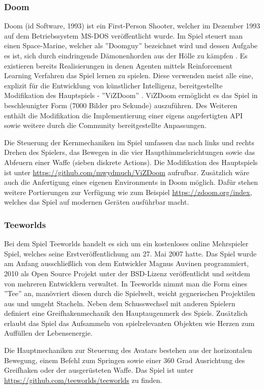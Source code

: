 \documentclass[11pt]{scrartcl}
\begin{document}
\subsubsection{Doom}
Doom (id Software, 1993) ist ein First-Person Shooter, welcher im Dezember 1993 auf dem Betriebssystem
MS-DOS veröffentlicht wurde. Im Spiel steuert man einen Space-Marine, welcher als ''Doomguy'' bezeichnet
wird und dessen Aufgabe es ist, sich durch eindringende Dämonenhorden aus der Hölle zu kämpfen
\cite{D1993}. Es existieren bereits Realisierungen in denen Agenten mittels Reinforcement Learning
Verfahren das Spiel lernen zu spielen. Diese verwenden meist alle eine, explizit für die Entwicklung
von künstlicher Intelligenz, bereitgestellte Modifikation des Hauptspiels - ''ViZDoom'' \cite{ViZDoom}. 
ViZDoom ermöglicht es das Spiel in beschleunigter Form (7000 Bilder pro Sekunde) auszuführen. Des
Weiteren enthält die Modifikation die Implementierung einer eigens angefertigten API sowie weitere
durch die Community bereitgestellte Anpassungen.

Die Steuerung der Kernmechaniken im Spiel umfassen das nach links und rechts Drehen des Spielers,
das Bewegen in die vier Haupthimmelsrichtungen sowie das Abfeuern einer Waffe (sieben diskrete
Actions). Die Modifikation des Hauptspiels ist unter \url{https://github.com/mwydmuch/ViZDoom}
aufrufbar. Zusätzlich wäre auch die Anfertigung eines eigenen Environments in Doom möglich. Dafür
stehen weitere Portierungen zur Verfügung wie zum Beispiel \url{https://zdoom.org/index}, welches
das Spiel auf modernen Geräten ausführbar macht. 

\subsubsection{Teeworlds}
Bei dem Spiel Teeworlds handelt es sich um ein kostenloses online Mehrspieler Spiel, welches seine
Erstveröffentlichung am 27. Mai 2007 hatte. Das Spiel wurde am Anfang ausschließlich von dem
Entwickler Magnus Auvinen programmiert, 2010 als Open Source Projekt unter der BSD-Lizenz
veröffentlicht und seitdem von mehreren Entwicklern verwaltet. In Teeworlds nimmt man die Form
eines ''Tee'' an, manövriert diesen durch die Spielwelt, weicht gegnerischen Projektilen aus und
umgeht Stacheln. Neben dem Schusswechsel mit anderen Spielern definiert eine Greifhakenmechanik den
Hauptaugenmerk des Spiels. Zusätzlich erlaubt das Spiel das Aufsammeln von spielrelevanten Objekten
wie Herzen zum Auffüllen der Lebensenergie.

Die Hauptmechaniken zur Steuerung des Avatars bestehen aus der horizontalen Bewegung, einem Befehl
zum Springen sowie einer 360 Grad Ausrichtung des Greifhaken oder der ausgerüsteten Waffe.
Das Spiel ist unter \url{https://github.com/teeworlds/teeworlds} zu finden.
\end{document}
